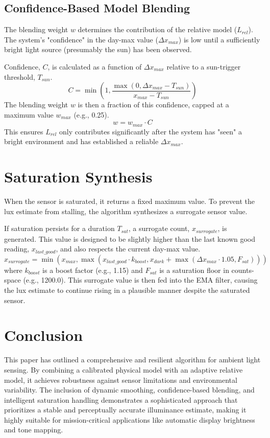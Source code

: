 \documentclass{article}
\begin{document}
\subsection{Confidence-Based Model Blending}
The blending weight $w$ determines the contribution of the relative model ($L_{rel}$). The system's "confidence" in the day-max value ($\Delta x_{max}$) is low until a sufficiently bright light source (presumably the sun) has been observed.

Confidence, $C$, is calculated as a function of $\Delta x_{max}$ relative to a sun-trigger threshold, $T_{sun}$.
\begin{equation}
    C = \min\left(1, \frac{\max(0, \Delta x_{max} - T_{sun})}{x_{max} - T_{sun}}\right)
\end{equation}
The blending weight $w$ is then a fraction of this confidence, capped at a maximum value $w_{max}$ (e.g., 0.25).
\begin{equation}
    w = w_{max} \cdot C
\end{equation}
This ensures $L_{rel}$ only contributes significantly after the system has "seen" a bright environment and has established a reliable $\Delta x_{max}$.

\section{Saturation Synthesis}
When the sensor is saturated, it returns a fixed maximum value. To prevent the lux estimate from stalling, the algorithm synthesizes a surrogate sensor value.

If saturation persists for a duration $T_{sat}$, a surrogate count, $x_{surrogate}$, is generated. This value is designed to be slightly higher than the last known good reading, $x_{last\_good}$, and also respects the current day-max value.
\begin{equation}
    x_{surrogate} = \min\left(x_{max}, \max(x_{last\_good} \cdot k_{boost}, x_{dark} + \max(\Delta x_{max} \cdot 1.05, F_{sat}))\right)
\end{equation}
where $k_{boost}$ is a boost factor (e.g., 1.15) and $F_{sat}$ is a saturation floor in counts-space (e.g., 1200.0). This surrogate value is then fed into the EMA filter, causing the lux estimate to continue rising in a plausible manner despite the saturated sensor.

\section{Conclusion}
This paper has outlined a comprehensive and resilient algorithm for ambient light sensing. By combining a calibrated physical model with an adaptive relative model, it achieves robustness against sensor limitations and environmental variability. The inclusion of dynamic smoothing, confidence-based blending, and intelligent saturation handling demonstrates a sophisticated approach that prioritizes a stable and perceptually accurate illuminance estimate, making it highly suitable for mission-critical applications like automatic display brightness and tone mapping.
\end{document}
